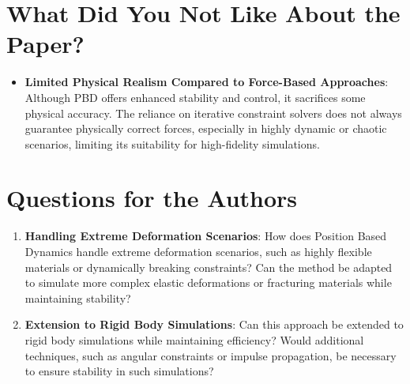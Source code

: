 \documentclass[12pt]{article}
\begin{document}
\section{What Did You Not Like About the Paper?}
\begin{itemize}[noitemsep]
    \item \textbf{Limited Physical Realism Compared to Force-Based Approaches}: Although PBD offers enhanced stability and control, it sacrifices some physical accuracy. The reliance on iterative constraint solvers does not always guarantee physically correct forces, especially in highly dynamic or chaotic scenarios, limiting its suitability for high-fidelity simulations.
\end{itemize}

\section{Questions for the Authors}
\begin{enumerate}[noitemsep]
    \item \textbf{Handling Extreme Deformation Scenarios}: How does Position Based Dynamics handle extreme deformation scenarios, such as highly flexible materials or dynamically breaking constraints? Can the method be adapted to simulate more complex elastic deformations or fracturing materials while maintaining stability?
    \item \textbf{Extension to Rigid Body Simulations}: Can this approach be extended to rigid body simulations while maintaining efficiency? Would additional techniques, such as angular constraints or impulse propagation, be necessary to ensure stability in such simulations?
\end{enumerate}
\end{document}
